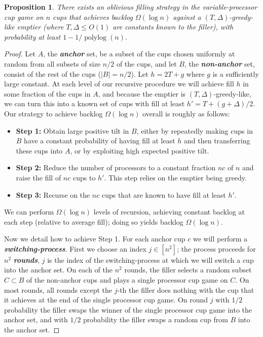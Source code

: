 \documentclass[twocolumn]{article}[11pt]
\newcommand{\defn}[1]{{\textit{\textbf{\boldmath #1}}}}
\DeclareMathOperator{\polylog}{\text{polylog}}
\newtheorem{proposition}{Proposition}
\begin{document}
\begin{proposition}
  \label{prop:obliviousBase}
  There exists an oblivious filling strategy in the variable-processor cup game
  on $n$ cups that achieves backlog $\Omega(\log n)$ against a $(T,
  \Delta)$-greedy-like emptier (where $T, \Delta \le O(1)$ are constants
  known to the filler), with probability at least $1-1/\polylog(n)$.
\end{proposition}
\begin{proof}
  Let $A$, the \defn{anchor} set, be a subset of the cups chosen uniformly at
  random from all subsets of size $n/2$ of the cups, and let $B$, the
  \defn{non-anchor} set, consist of the rest of the cups ($|B| = n/2$). 
  Let $h = 2 T + g $ where $g$ is a sufficiently large constant. At each
  level of our recursive procedure we will achieve fill $h$ in some fraction of
  the cups in $A$, and because the emptier is $(T, \Delta)$-greedy-like, we can turn this into a
  known set of cups with fill at least $h' = T + (g+\Delta)/2$.
  Our strategy to achieve backlog $\Omega(\log n)$ overall is roughly as follows:
  \begin{itemize}
    \item \textbf{Step 1:} 
      Obtain large positive tilt in $B$, either by repeatedly making cups in
      $B$ have a constant probability of having fill at least $h$ and then
      transferring these cups into $A$, or by exploiting high expected positive tilt.
  \item \textbf{Step 2:} Reduce the number of processors to a constant fraction $nc$ of $n$ and
    raise the fill of $nc$ cups to $h'$. This step relies on the emptier being
    greedy.
  \item \textbf{Step 3:} Recurse on the $nc$ cups that are known to have fill at least $h'$.
\end{itemize}
We can perform $\Omega(\log n)$ levels of recursion, achieving constant backlog
at each step (relative to average fill); doing so yields backlog $\Omega(\log
n)$.

Now we detail how to achieve Step 1.
For each anchor cup $c$ we will perform a \defn{switching-process}.
First we choose an index $j \in [n^2]$; the process proceeds for $n^2$
\defn{rounds}, $j$ is the index of the switching-process at which we will
switch a cup into the anchor set.
On each of the $n^2$ rounds, the filler selects a random subset $C\subset B$ of
the non-anchor cups and plays a single processor cup game on $C$.
On most rounds, all rounds except the $j$-th the filler does nothing with the
cup that it achieves at the end of the single processor cup game.
On round $j$ with $1/2$ probability the filler swaps the winner of the single processor
cup game into the anchor set, and with $1/2$ probability the filler swaps a random cup
from $B$ into the anchor set.


\end{proof}
\end{document}
